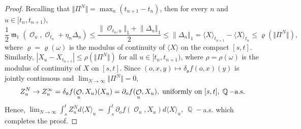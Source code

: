 \documentclass[11pt]{article}
\def\mo{\mathfrak{o}}
\theoremstyle{plain}
\theoremstyle{definition}
\DeclareMathOperator{\Q}{\mathbb{Q}}
\DeclareMathOperator{\R}{\mathbb{R}}
\DeclareMathOperator{\calO}{\mathcal{O}}
\DeclareMathOperator{\frakm}{\mathfrak{m}}
\begin{document}
\begin{proof}
Recalling that  $\Vert \Pi^N\Vert = \max_{n}(t_{n+1} - t_n)$, then for every $n$ and $u\in [t_n,t_{n+1})$, 
$$\frac{1}{2}\frakm_1(\calO_{u},\calO_{t_{n}}+ \eta_n  \Delta_n)\le \frac{\lVert \calO_{t_n,u}\Vert_1  + \lVert \Delta_n\Vert_1}{2} \le \lVert \Delta_n\Vert_1 = \langle X \rangle_{t_{n+1}} - \langle X \rangle_{t_{n}}\le \varrho(\Vert \Pi^N\Vert),$$
where $\varrho = \varrho(\omega)$ is the modulus of continuity of $\langle X \rangle$ on the compact $[s,t]$. Similarly,   
$|X_{u} - X_{t_{n+1}}| \le \rho(\Vert \Pi^N\Vert)$ for all $u\in [t_n,t_{n+1})$,  where $\rho = \rho(\omega)$ is the modulus of continuity of $X$ on  $[s,t]$. %
Since  $(o,x,y) \mapsto \delta_\mo f(o,x)(y)$ is jointly continuous and $\lim_{N\to \infty}\Vert \Pi^N\Vert = 0$,%
$$Z^N_u \to Z_u^{\infty} = \delta_\mo  f(\calO_{u},X_{u})(X_u) = \partial_o  f(\calO_{u},X_{u}), \;  \text{uniformly  on  $ [s,t]$},\; \Q-\text{a.s.}$$
Hence,   
$\lim_{N\to \infty} \int_s^t Z^N_u d\langle X \rangle_u = \int_s^t \partial_o  f(\calO_{u},X_{u}) d\langle X \rangle_u, \  \Q-$a.s. which completes the proof.

\end{proof}
\end{document}
